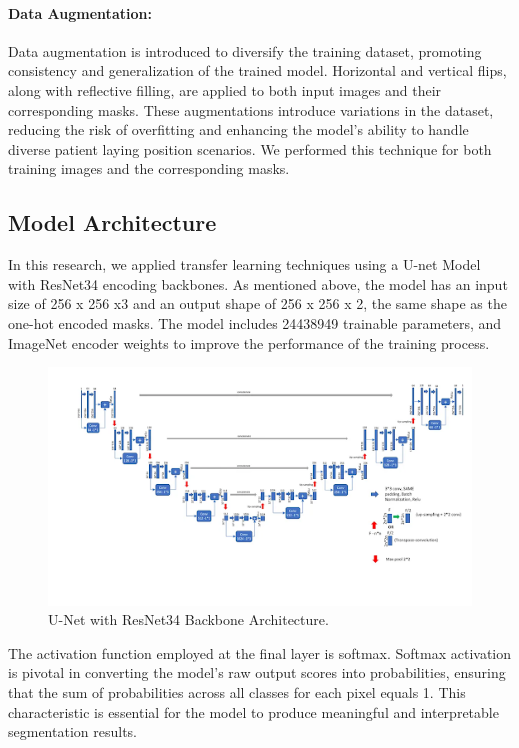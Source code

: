 \documentclass[]{acmsiggraph}
\begin{document}
\paragraph{Data Augmentation:}
Data augmentation is introduced to diversify the training dataset, promoting consistency and generalization of the trained model. Horizontal and vertical flips, along with reflective filling, are applied to both input images and their corresponding masks. These augmentations introduce variations in the dataset, reducing the risk of overfitting and enhancing the model's ability to handle diverse patient laying position scenarios. We performed this technique for both training images and the corresponding masks.

\subsection{Model Architecture}
In this research, we applied transfer learning techniques using a U-net Model with ResNet34 encoding backbones. As mentioned above, the model has an input size of 256 x 256 x3 and an output shape of 256 x 256 x 2, the same shape as the one-hot encoded masks. The model includes 24438949 trainable parameters, and ImageNet encoder weights to improve the performance of the training process.

\begin{figure}[h]\centering
 \includegraphics[width=0.75\linewidth]{images/model.png}
 \caption{\label{fig:reference}U-Net with ResNet34 Backbone Architecture.}
\end{figure}

The activation function employed at the final layer is softmax. Softmax activation is pivotal in converting the model's raw output scores into probabilities, ensuring that the sum of probabilities across all classes for each pixel equals 1. This characteristic is essential for the model to produce meaningful and interpretable segmentation results.
\end{document}
